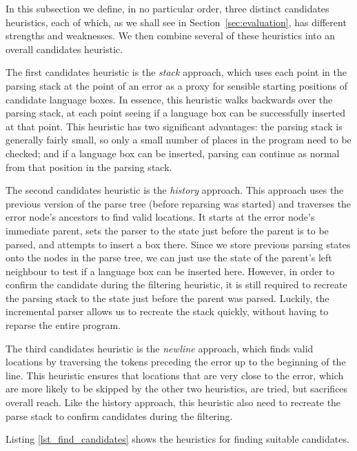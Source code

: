 \documentclass[sigplan,screen]{acmart}\settopmatter{printfolios=true,printccs=false,printacmref=false}
\begin{document}
In this subsection we define, in no particular order, three
distinct candidates heuristics, each of which, as we shall see in
Section~\ref{sec:evaluation}, has different strengths and weaknesses. We then
combine several of these heuristics into an overall candidates heuristic.

The first candidates heuristic is the \emph{stack} approach, which uses each
point in the parsing stack at the point of an error as a proxy for sensible
starting positions of candidate language boxes. In essence, this heuristic
walks backwards over the parsing stack, at each point seeing if a language box
can be successfully inserted at that point. This heuristic has two significant
advantages: the parsing stack is generally fairly small, so only a small number
of places in the program need to be checked; and if a language box can be
inserted, parsing can continue as normal from that position in the parsing
stack.

The second candidates heuristic is the \emph{history} approach. This approach
uses the previous version of the parse tree (before reparsing was started) and
traverses the error node's ancestors to find valid locations. It starts at the
error node's immediate parent, sets the parser to the state just before the
parent is to be parsed, and attempts to insert a box there. Since we store
previous parsing states onto the nodes in the parse tree, we can just use the
state of the parent's left neighbour to test if a language box can be inserted
here. However, in order to confirm the candidate during the filtering
heuristic, it is still required to recreate the parsing stack to the state just
before the parent was parsed. Luckily, the incremental parser allows us to recreate
the stack quickly, without having to reparse the entire program.

The third candidates heuristic is the \emph{newline} approach, which finds
valid locations by traversing the tokens preceding the error up to the
beginning of the line. This heuristic ensures that locations that are very
close to the error, which are more likely to be skipped by the other two
heuristics, are tried, but sacrifices overall reach. Like the history approach,
this heuristic also need to recreate the parse stack to confirm candidates
during the filtering.

Listing \ref{lst_find_candidates} shows the heuristics for finding suitable
candidates.
\end{document}
